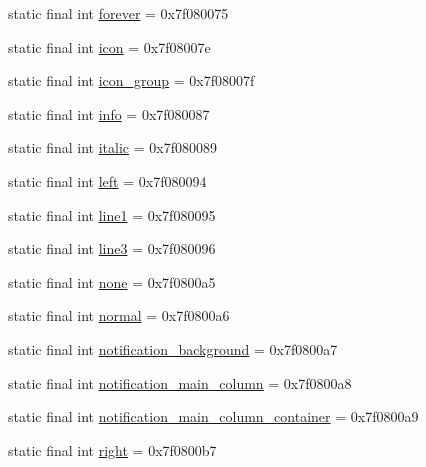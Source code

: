 \begin{DoxyCompactItemize}
static final int \mbox{\hyperlink{classandroid_1_1support_1_1coreui_1_1_r_1_1id_a36dcc6cf4dd0fe587ac280966c92b655}{forever}} = 0x7f080075
\item 
static final int \mbox{\hyperlink{classandroid_1_1support_1_1coreui_1_1_r_1_1id_a98b9aa8151b1cf84e12e8e04f1bde7e5}{icon}} = 0x7f08007e
\item 
static final int \mbox{\hyperlink{classandroid_1_1support_1_1coreui_1_1_r_1_1id_a215db00b79212e0e082308d19af3a2d6}{icon\+\_\+group}} = 0x7f08007f
\item 
static final int \mbox{\hyperlink{classandroid_1_1support_1_1coreui_1_1_r_1_1id_a768cab4424f371839e8b9e05f341ea9a}{info}} = 0x7f080087
\item 
static final int \mbox{\hyperlink{classandroid_1_1support_1_1coreui_1_1_r_1_1id_ab7faa79cdfae716e227b401e6a756cb6}{italic}} = 0x7f080089
\item 
static final int \mbox{\hyperlink{classandroid_1_1support_1_1coreui_1_1_r_1_1id_aa822d414d0a9f276d0a8b6877759d8c1}{left}} = 0x7f080094
\item 
static final int \mbox{\hyperlink{classandroid_1_1support_1_1coreui_1_1_r_1_1id_aaa8a0952698af28f471fe64491e85c36}{line1}} = 0x7f080095
\item 
static final int \mbox{\hyperlink{classandroid_1_1support_1_1coreui_1_1_r_1_1id_a11398f0251793b4ff1b2d508f75802e9}{line3}} = 0x7f080096
\item 
static final int \mbox{\hyperlink{classandroid_1_1support_1_1coreui_1_1_r_1_1id_a9da8df6a0db3c835428fd3ece9aa11a5}{none}} = 0x7f0800a5
\item 
static final int \mbox{\hyperlink{classandroid_1_1support_1_1coreui_1_1_r_1_1id_a8c28c674124fa95312feac38a09526df}{normal}} = 0x7f0800a6
\item 
static final int \mbox{\hyperlink{classandroid_1_1support_1_1coreui_1_1_r_1_1id_a0b9af4a1e06b28761d436b676729f93a}{notification\+\_\+background}} = 0x7f0800a7
\item 
static final int \mbox{\hyperlink{classandroid_1_1support_1_1coreui_1_1_r_1_1id_a586a29236457147e23b87d5d0f2c7278}{notification\+\_\+main\+\_\+column}} = 0x7f0800a8
\item 
static final int \mbox{\hyperlink{classandroid_1_1support_1_1coreui_1_1_r_1_1id_a24527be0b778086c182e7c3d930d3803}{notification\+\_\+main\+\_\+column\+\_\+container}} = 0x7f0800a9
\item 
static final int \mbox{\hyperlink{classandroid_1_1support_1_1coreui_1_1_r_1_1id_a97ead7fdd3d2651d71172811b5f3c34b}{right}} = 0x7f0800b7

\end{DoxyCompactItemize}
